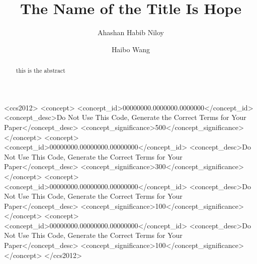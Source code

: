 \documentclass[sigconf]{acmart}
\begin{document}
\title{The Name of the Title Is Hope}

\author{Ahashan Habib Niloy}
\correspondingauthor
\authornotemark[1]

\author{Haibo Wang}



\renewcommand{\shortauthors}{Niloy et al.}

\begin{abstract}
    this is the abstract
 
\end{abstract}

\begin{CCSXML}
<ccs2012>
 <concept>
  <concept_id>00000000.0000000.0000000</concept_id>
  <concept_desc>Do Not Use This Code, Generate the Correct Terms for Your Paper</concept_desc>
  <concept_significance>500</concept_significance>
 </concept>
 <concept>
  <concept_id>00000000.00000000.00000000</concept_id>
  <concept_desc>Do Not Use This Code, Generate the Correct Terms for Your Paper</concept_desc>
  <concept_significance>300</concept_significance>
 </concept>
 <concept>
  <concept_id>00000000.00000000.00000000</concept_id>
  <concept_desc>Do Not Use This Code, Generate the Correct Terms for Your Paper</concept_desc>
  <concept_significance>100</concept_significance>
 </concept>
 <concept>
  <concept_id>00000000.00000000.00000000</concept_id>
  <concept_desc>Do Not Use This Code, Generate the Correct Terms for Your Paper</concept_desc>
  <concept_significance>100</concept_significance>
 </concept>
</ccs2012>
\end{CCSXML}
\end{document}

